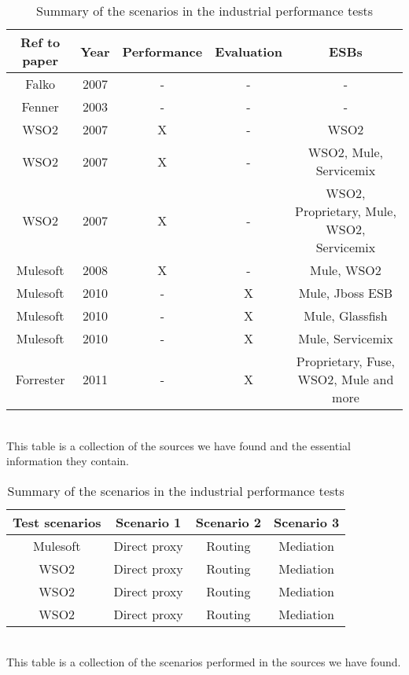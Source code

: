 \begin{table}
	\caption{Summary of industrial papers and what tests they perform}
	\begin{tabular}{| c | c | c | c | c |}
		\hline
		Ref to paper & Year & Performance & Evaluation & ESBs \\ 
		\hline	
		Falko \cite{falko07} & 2007 & - & - & - \\ 
		\hline	
		Fenner \cite{fenner03} & 2003 & - & - & - \\
		\hline	
		WSO2 \cite{Perera07} & 2007 & X & - & WSO2 \\
		\hline	
		WSO2 \cite{Perera07R2} & 2007 & X & - & WSO2, Mule, Servicemix\\
		\hline	
		WSO2 \cite{Perera07R3} & 2007 & X & - & WSO2, Proprietary, Mule, WSO2, Servicemix \\
		\hline	
		Mulesoft \cite{mulesoft08} & 2008 & X & - & Mule, WSO2\\
		\hline	
		Mulesoft \cite{mulevsjboss} & 2010 & - & X & Mule, Jboss ESB\\
		\hline	
		Mulesoft \cite{mulevsglassfish} & 2010 & - & X & Mule, Glassfish \\
		\hline	
		Mulesoft \cite{mulevsservicemix} & 2010 & - & X & Mule, Servicemix \\
		\hline
		Forrester \cite{forrester11} & 2011 & - & X & Proprietary, Fuse, WSO2, Mule and more\\
		\hline
	\end{tabular}
	\\
	This table is a collection of the sources we have found and the essential information they contain.

	\caption{Summary of the scenarios in the industrial performance tests}
	\begin{tabular}{| c | c | c | c |}
		\hline
		Test scenarios & Scenario 1 & Scenario 2 & Scenario 3 \\
		\hline
		Mulesoft \cite{mulesoft08} & Direct proxy & Routing & Mediation \\
		\hline
		WSO2 \cite{Perera07} & Direct proxy & Routing & Mediation \\
		\hline
		WSO2 \cite{Perera07R2} & Direct proxy & Routing & Mediation \\
		\hline
		WSO2 \cite{Perera07R3} & Direct proxy & Routing & Mediation \\
		\hline
	\end{tabular}
	\\
	This table is a collection of the scenarios performed in the sources we have found. 
\end{table}

